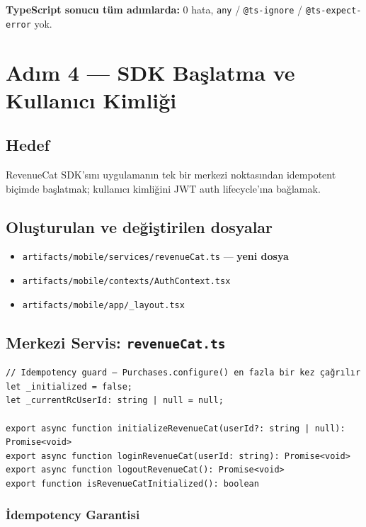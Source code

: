 \documentclass[12pt,a4paper]{article}
\begin{document}
\medskip
\noindent\textbf{TypeScript sonucu tüm adımlarda:} 0 hata, \texttt{any} / \texttt{@ts-ignore} / \texttt{@ts-expect-error} yok.

\section{Adım 4 — SDK Başlatma ve Kullanıcı Kimliği}

\subsection{Hedef}

RevenueCat SDK'sını uygulamanın tek bir merkezi noktasından idempotent biçimde başlatmak;
kullanıcı kimliğini JWT auth lifecycle'ına bağlamak.

\subsection{Oluşturulan ve değiştirilen dosyalar}

\begin{itemize}[leftmargin=1.5em]
  \item \texttt{artifacts/mobile/services/revenueCat.ts} — \textbf{yeni dosya}
  \item \texttt{artifacts/mobile/contexts/AuthContext.tsx}
  \item \texttt{artifacts/mobile/app/\_layout.tsx}
\end{itemize}

\subsection{Merkezi Servis: \texttt{revenueCat.ts}}

\begin{lstlisting}[language={}]
// Idempotency guard — Purchases.configure() en fazla bir kez çağrılır
let _initialized = false;
let _currentRcUserId: string | null = null;

export async function initializeRevenueCat(userId?: string | null): Promise<void>
export async function loginRevenueCat(userId: string): Promise<void>
export async function logoutRevenueCat(): Promise<void>
export function isRevenueCatInitialized(): boolean
\end{lstlisting}

\subsubsection{İdempotency Garantisi}
\end{document}
